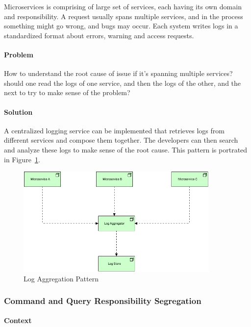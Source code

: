 \documentclass{bmcart}
\begin{document}
Microservices is comprising of large set of services, each having its own domain and responsibility. A request usually spans multiple services, and in the process something might go wrong, and bugs may occur. Each system writes logs in a standardized format about errors, warning and access requests. 

\paragraph{Problem}

How to understand the root cause of issue if it's spanning multiple services? should one read the logs of one service, and then the logs of the other, and the next to try to make sense of the problem?  

\paragraph{Solution}

A centralized logging service can be implemented that retrieves logs from different services and compose them together. The developers can then search and analyze these logs to make sense of the root cause. This pattern is portrated in Figure~\ref{logAggregation}.


\begin{figure}[h]
  \includegraphics[width=10cm]{Media/Log Aggregation Pattern.jpg}
  \caption{Log Aggregation Pattern}
  \label{logAggregation}
\end{figure}

\subsubsection{Command and Query Responsibility Segregation}

\paragraph{Context}
\end{document}
